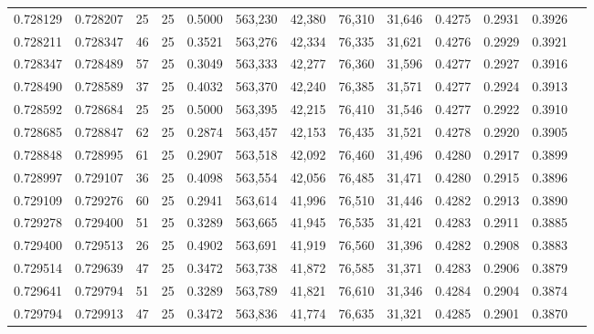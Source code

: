 \begin{tabular}{rrrrrrrrrrrrr}
0.728129 & 0.728207 &    25 &  25 &                                     0.5000 & 563,230 &  42,380 &  76,310 &  31,646 & 0.4275 & 0.2931 & 0.3926 \\
0.728211 & 0.728347 &    46 &  25 &                                     0.3521 & 563,276 &  42,334 &  76,335 &  31,621 & 0.4276 & 0.2929 & 0.3921 \\
0.728347 & 0.728489 &    57 &  25 &                                     0.3049 & 563,333 &  42,277 &  76,360 &  31,596 & 0.4277 & 0.2927 & 0.3916 \\
0.728490 & 0.728589 &    37 &  25 &                                     0.4032 & 563,370 &  42,240 &  76,385 &  31,571 & 0.4277 & 0.2924 & 0.3913 \\
0.728592 & 0.728684 &    25 &  25 &                                     0.5000 & 563,395 &  42,215 &  76,410 &  31,546 & 0.4277 & 0.2922 & 0.3910 \\
0.728685 & 0.728847 &    62 &  25 &                                     0.2874 & 563,457 &  42,153 &  76,435 &  31,521 & 0.4278 & 0.2920 & 0.3905 \\
0.728848 & 0.728995 &    61 &  25 &                                     0.2907 & 563,518 &  42,092 &  76,460 &  31,496 & 0.4280 & 0.2917 & 0.3899 \\
0.728997 & 0.729107 &    36 &  25 &                                     0.4098 & 563,554 &  42,056 &  76,485 &  31,471 & 0.4280 & 0.2915 & 0.3896 \\
0.729109 & 0.729276 &    60 &  25 &                                     0.2941 & 563,614 &  41,996 &  76,510 &  31,446 & 0.4282 & 0.2913 & 0.3890 \\
0.729278 & 0.729400 &    51 &  25 &                                     0.3289 & 563,665 &  41,945 &  76,535 &  31,421 & 0.4283 & 0.2911 & 0.3885 \\
0.729400 & 0.729513 &    26 &  25 &                                     0.4902 & 563,691 &  41,919 &  76,560 &  31,396 & 0.4282 & 0.2908 & 0.3883 \\
0.729514 & 0.729639 &    47 &  25 &                                     0.3472 & 563,738 &  41,872 &  76,585 &  31,371 & 0.4283 & 0.2906 & 0.3879 \\
0.729641 & 0.729794 &    51 &  25 &                                     0.3289 & 563,789 &  41,821 &  76,610 &  31,346 & 0.4284 & 0.2904 & 0.3874 \\
0.729794 & 0.729913 &    47 &  25 &                                     0.3472 & 563,836 &  41,774 &  76,635 &  31,321 & 0.4285 & 0.2901 & 0.3870 \\

\end{tabular}
